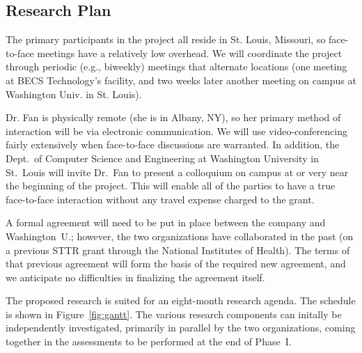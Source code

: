 \subsection{Research Plan}

The primary participants in the project all reside in St. Louis, Missouri,
so face-to-face meetings have a relatively low overhead. We will coordinate
the project through periodic (e.g., biweekly) meetings that alternate
locations (one meeting at BECS Technology's facility, and two weeks later
another meeting on campus at Washington Univ. in St. Louis).

Dr. Fan is physically remote (she is in Albany, NY), so her primary
method of interaction will be via electronic communication.  We will
use video-conferencing fairly extensively when face-to-face discussions
are warranted.  In addition, the Dept.~of Computer Science and Engineering
at Washington University in St.~Louis
will invite Dr.~Fan to present a colloquium on campus at or very near
the beginning of the project.  This will enable all of the parties to
have a true face-to-face interaction without any travel expense charged
to the grant.

A formal agreement will need to be put in place between the company and
Washington~U.; however, the two organizations have collaborated in the
past (on a previous STTR grant through the National Institutes of Health).
The terms of that previous agreement will form the
basis of the required new agreement, and we anticipate no difficulties
in finalizing the agreement itself.

The proposed research is suited for an eight-month research agenda.
The schedule is shown in Figure~\ref{fig:gantt}.
The various research components can initally be independently investigated,
primarily in parallel by the two organizations, coming together
in the assessments to be performed at the end of Phase~I.

